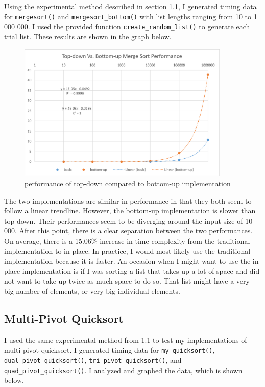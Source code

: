 \documentclass[12pt]{article}
\begin{document}
Using the experimental method described in section 1.1, I generated timing data for  \verb+mergesort()+ and \verb+mergesort_bottom()+ with list lengths ranging from 10 to 1 000 000. I used the provided function \verb+create_random_list()+ to generate each trial list. These results are shown in the graph below. 

\begin{figure}[H]
\centering
\includegraphics[width=0.9\textwidth,height=\textheight,keepaspectratio]{bottom_up}
\caption{performance of top-down compared to bottom-up implementation}
\label{Figure: i1}
\end{figure}
\noindent The two implementations are similar in performance in that they both seem to follow a linear trendline. However, the bottom-up implementation is slower than top-down. Their performances seem to be diverging around the input size of 10 000. After this point, there is a clear separation between the two performances. On average, there is a 15.06\% increase in time complexity from the traditional implementation to in-place.
In practice, I would most likely use the traditional implementation because it is faster. An occasion when I might want to use the in-place implementation is if I was sorting a list that takes up a lot of space and did not want to take up twice as much space to do so. That list might have a very big number of elements, or very big individual elements. 

\subsection{Multi-Pivot Quicksort}
I used the same experimental method from 1.1 to test my implementations of multi-pivot quicksort. I generated timing data for \verb+my_quicksort()+, \verb+dual_pivot_quicksort()+, \verb+tri_pivot_quicksort()+, and \verb+quad_pivot_quicksort()+. I analyzed and graphed the data, which is shown below.
\end{document}
